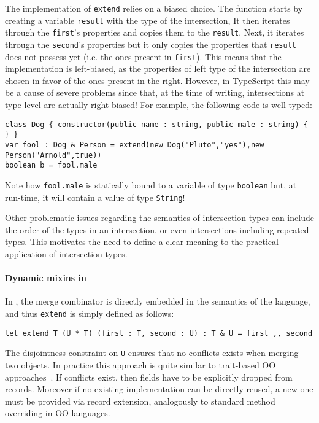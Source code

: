 The implementation of \lstinline{extend} relies on a biased choice.
The function starts by creating a variable \lstinline$result$ with the type of the intersection, 
It then iterates through the \lstinline$first$'s properties and copies them to the 
\lstinline$result$.
Next, it iterates through the \lstinline$second$'s properties but it only copies the properties
that \lstinline$result$ does not possess yet (i.e. the ones present in \lstinline$first$).
This means that the implementation is left-biased, as the properties of left type of the intersection
are chosen in favor of the ones present in the right.
However, in TypeScript this may be a cause of severe problems since that, at the time of writing,
intersections at type-level are actually right-biased!
For example, the following code is well-typed:

\begin{lstlisting}
class Dog { constructor(public name : string, public male : string) { } }
var fool : Dog & Person = extend(new Dog("Pluto","yes"),new Person("Arnold",true))
boolean b = fool.male
\end{lstlisting}
Note how \lstinline$fool.male$ is statically bound to a variable of type \lstinline$boolean$ but, at run-time, 
it will contain a value of type \lstinline$String$! 

Other problematic issues regarding the semantics of intersection types can include the order of 
the types in an intersection, or even intersections including repeated types.
This motivates the need to define a clear meaning to the practical application of 
intersection types.

\paragraph{Dynamic mixins in \name}
In \name, the merge combinator is directly embedded in the semantics
of the language, and thus \lstinline{extend} is simply defined as
follows:

\begin{lstlisting}
let extend T (U * T) (first : T, second : U) : T & U = first ,, second 
\end{lstlisting}

\noindent The disjointness constraint on \lstinline{U} ensures that 
no conflicts exists when merging two objects. In practice this approach
is quite similar to trait-based OO
approaches~\cite{}. If conflicts exist, then fields have to be explicitly
dropped from records. Moreover if no existing implementation can be
directly reused, a new one must be provided via record extension,
analogously to standard method overriding in OO languages. 

